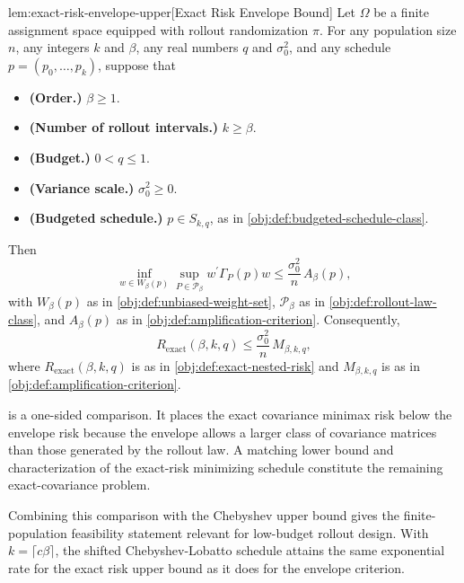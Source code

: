 \begin{lemmav}{lem:exact-risk-envelope-upper}[Exact Risk Envelope Bound]
Let $\Omega$ be a finite assignment space equipped with rollout randomization $\pi$. For any population size $n$, any integers $k$ and $\beta$, any real numbers $q$ and $\sigma_0^2$, and any schedule $p=(p_0,\ldots,p_k)$, suppose that
\begin{itemize}
\item \textbf{(Order.)} $\beta\ge 1$.
\item \textbf{(Number of rollout intervals.)} $k\ge \beta$.
\item \textbf{(Budget.)} $0<q\le 1$.
\item \textbf{(Variance scale.)} $\sigma_0^2\ge 0$.
\item \textbf{(Budgeted schedule.)} $p\in S_{k,q}$, as in \cref{obj:def:budgeted-schedule-class}.
\end{itemize}
Then
\[
\inf_{w\in W_\beta(p)}
\sup_{P\in\mathcal P_\beta}
w^\prime \Gamma_P(p) w
\le
\frac{\sigma_0^2}{n}\,A_\beta(p),
\]
with $W_\beta(p)$ as in \cref{obj:def:unbiased-weight-set}, $\mathcal P_\beta$ as in \cref{obj:def:rollout-law-class}, and $A_\beta(p)$ as in \cref{obj:def:amplification-criterion}. Consequently,
\[
R_{\mathrm{exact}}(\beta,k,q)
\le
\frac{\sigma_0^2}{n}\,M_{\beta,k,q},
\]
where $R_{\mathrm{exact}}(\beta,k,q)$ is as in \cref{obj:def:exact-nested-risk} and $M_{\beta,k,q}$ is as in \cref{obj:def:amplification-criterion}.
\end{lemmav}

 is a one-sided comparison. It places the exact covariance minimax risk below the envelope risk because the envelope allows a larger class of covariance matrices than those generated by the rollout law. A matching lower bound and characterization of the exact-risk minimizing schedule constitute the remaining exact-covariance problem.

Combining this comparison with the Chebyshev upper bound gives the finite-population feasibility statement relevant for low-budget rollout design. With \(k=\lceil c\beta\rceil\), the shifted Chebyshev-Lobatto schedule attains the same exponential rate for the exact risk upper bound as it does for the envelope criterion.

